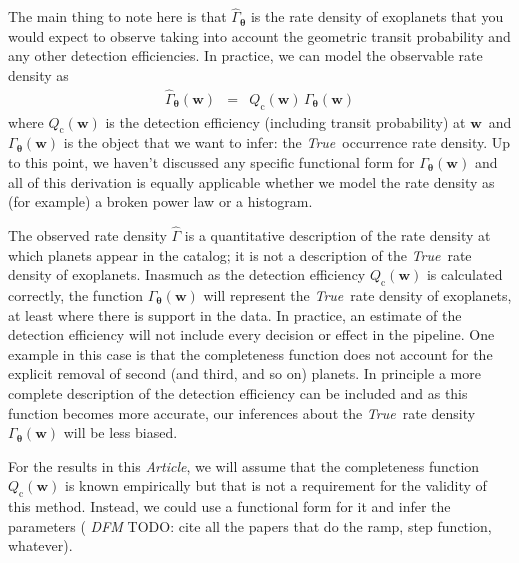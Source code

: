\documentclass[12pt,preprint]{aastex}
\newcommand{\paper}{\textsl{Article}}
\newcommand{\foreign}[1]{\emph{#1}}
\newcommand{\True}{\foreign{True}}
\newcommand{\eqlabel}[1]{\label{eq:#1}}
\newcommand{\bvec}[1]{\ensuremath{\boldsymbol{#1}}}
\newcommand{\todo}[3]{{\color{#2} \emph{#1} TODO: #3}}
\newcommand{\dfmtodo}[1]{\todo{DFM}{red}{#1}}
\newcommand{\rate}{\ensuremath{\Gamma}}
\newcommand{\ratepar}{{\ensuremath{\theta}}}
\newcommand{\ratepars}{{\ensuremath{\bvec{\ratepar}}}}
\newcommand{\obs}[1]{\ensuremath{\hat{#1}}}
\newcommand{\completeness}{{\ensuremath{Q_\mathrm{c}}}}
\newcommand{\entry}{{\ensuremath{\bvec{w}}}}
\begin{document}
The main thing to note here is that $\obs{\rate}_\ratepars$ is the rate
density of exoplanets that you would expect to observe taking into account the
geometric transit probability and any other detection efficiencies.
In practice, we can model the observable rate density as
\begin{eqnarray}\eqlabel{obs-rate}
\obs{\rate}_\ratepars(\entry) &=&
    \completeness(\entry)\,\rate_\ratepars(\entry)
\end{eqnarray}
where $\completeness(\entry)$ is the detection efficiency (including transit
probability) at \entry\ and $\rate_\ratepars(\entry)$ is the object that we
want to infer: the \True\ occurrence rate density.
Up to this point, we haven't discussed any specific functional form for
$\rate_\ratepars(\entry)$ and all of this derivation is equally applicable
whether we model the rate density as (for example) a broken power law or
a histogram.

The observed rate density \obs{\rate} is a quantitative description of the
rate density at which planets appear in the \citet{petigura} catalog; it is
not a description of the \True\ rate density of exoplanets.
Inasmuch as the detection efficiency $\completeness(\entry)$ is calculated
correctly, the function $\rate_\ratepars(\entry)$ will represent the \True\
rate density of exoplanets, at least where there is support in the data.
In practice, an estimate of the detection efficiency will not include every
decision or effect in the pipeline.
One example in this case is that the completeness function does not account
for the explicit removal of second (and third, and so on) planets.
In principle a more complete description of the detection efficiency can be
included and as this function becomes more accurate, our inferences about the
\True\ rate density $\rate_\ratepars(\entry)$ will be less biased.

For the results in this \paper, we will assume that the completeness function
$\completeness(\entry)$ is known empirically but that is not a requirement for
the validity of this method.
Instead, we could use a functional form for it and infer the parameters
(\dfmtodo{cite all the papers that do the ramp, step function, whatever}).
\end{document}
